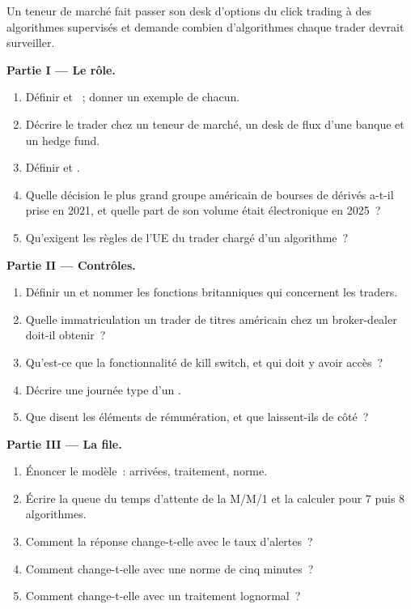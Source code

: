 \begin{problem}\label{pb:in:trader:1}
Un teneur de marché fait passer son desk d'options du click trading à des algorithmes supervisés et demande combien d'algorithmes chaque
trader devrait surveiller.

\medskip\noindent\textbf{Partie I --- Le rôle.}
\begin{enumerate}
\item Définir  et ~; donner un exemple de chacun.
\item Décrire le trader chez un teneur de marché, un desk de flux d'une banque et un hedge fund.
\item Définir  et .
\item Quelle décision le plus grand groupe américain de bourses de dérivés a-t-il prise en 2021, et quelle part de son volume était électronique en
2025~?
\item Qu'exigent les règles de l'UE du trader chargé d'un algorithme~?
\end{enumerate}

\medskip\noindent\textbf{Partie II --- Contrôles.}
\begin{enumerate}[resume]
\item Définir un  et nommer les fonctions britanniques qui concernent les traders.
\item Quelle immatriculation un trader de titres américain chez un broker-dealer doit-il obtenir~?
\item Qu'est-ce que la fonctionnalité de kill switch, et qui doit y avoir accès~?
\item Décrire une journée type d'un .
\item Que disent les éléments de rémunération, et que laissent-ils de côté~?
\end{enumerate}

\medskip\noindent\textbf{Partie III --- La file.}
\begin{enumerate}[resume]
\item Énoncer le modèle~: arrivées, traitement, norme.
\item Écrire la queue du temps d'attente de la M/M/1 et la calculer pour 7 puis 8 algorithmes.
\item Comment la réponse change-t-elle avec le taux d'alertes~?
\item Comment change-t-elle avec une norme de cinq minutes~?
\item Comment change-t-elle avec un traitement lognormal~?
\end{enumerate}


\end{problem}
